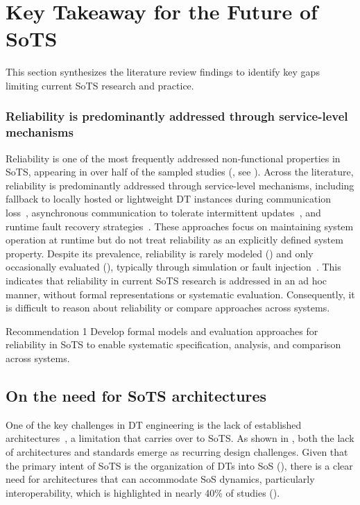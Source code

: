 \section{Key Takeaway for the Future of SoTS}\label{sec:literature-review-key-takeaways}
This section synthesizes the literature review findings to identify key gaps limiting current SoTS research and practice.

\subsubsection{Reliability is predominantly addressed through service-level mechanisms}
Reliability is one of the most frequently addressed non-functional properties in SoTS, appearing in over half of the sampled studies (, see ). Across the literature, reliability is predominantly addressed through service-level mechanisms, including fallback to locally hosted or lightweight DT instances during communication loss~\cite{alam2017c2ps,larsen2024towards}, asynchronous communication to tolerate intermittent updates~\cite{acharya2023twins,liu2020web-based}, and runtime fault recovery strategies~\cite{esterle2021digital,villalonga2021decision-making}.  These approaches focus on maintaining system operation at runtime but do not treat reliability as an explicitly defined system property. Despite its prevalence, reliability is rarely modeled () and only occasionally evaluated (), typically through simulation or fault injection~\cite{park2020digital,saraeian2022digital}.  This indicates that reliability in current SoTS research is addressed in an ad hoc manner, without formal representations or systematic evaluation. Consequently, it is difficult to reason about reliability or compare approaches across systems.

\begin{recoframe}{Recommendation 1}
Develop formal models and evaluation approaches for reliability in SoTS to enable systematic specification, analysis, and comparison across systems.
\end{recoframe}

\subsection{On the need for SoTS architectures}

One of the key challenges in DT engineering is the lack of established architectures~\cite{ferko2022architecting}, a limitation that carries over to SoTS. As shown in , both the lack of architectures and standards emerge as recurring design challenges. Given that the primary intent of SoTS is the organization of DTs into SoS (), there is a clear need for architectures that can accommodate SoS dynamics, particularly interoperability, which is highlighted in nearly 40\% of studies ().

